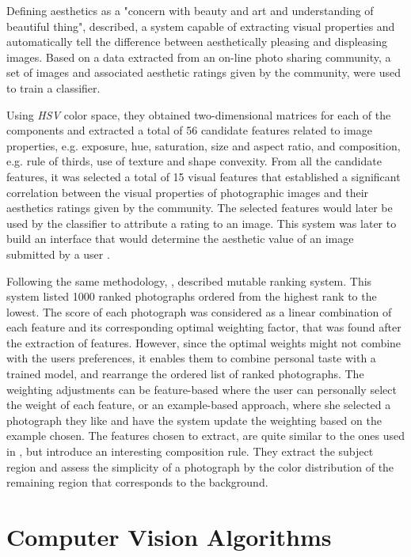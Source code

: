 Defining aesthetics as a "concern with beauty and art and understanding of beautiful thing", \citeauthor{Datta} \cite{Datta} described, a system capable of extracting visual properties and automatically tell the difference between aesthetically pleasing and displeasing images. 
Based on a data extracted from an on-line photo sharing community, a set of images and associated aesthetic ratings given by the community, were used to train a classifier.

Using \emph{HSV} color space, they obtained two-dimensional matrices for each of the components and extracted a total of 56 candidate features related to image properties, e.g. exposure, hue, saturation, size and aspect ratio, and composition, e.g. rule of thirds, use of texture and shape convexity.
From all the candidate features, it was selected a total of 15 visual features that established a significant correlation between the visual properties of photographic images and their aesthetics ratings given by the community. The selected features would later be used by the classifier to attribute a rating to an image.
This system was later to build an interface that would determine the aesthetic value of an image submitted by a user \cite{Datta2010}.

Following the same methodology, \citeauthor{Yeh} \cite{Yeh}, described mutable ranking system. This system listed 1000 ranked photographs ordered from the highest rank to the lowest. The score of each photograph was considered as a linear combination of each feature and its corresponding optimal weighting factor, that was found after the extraction of features. However, since the optimal weights might not combine with the users preferences, it enables them to combine personal taste with a trained model, and rearrange the ordered list of ranked photographs.
The weighting adjustments can be feature-based where the user can personally select the weight of each feature, or an example-based approach, where she selected a photograph they like and have the system update the weighting based on the example chosen.
The features chosen to extract, are quite similar to the ones used in \cite{Datta}, but introduce an interesting composition rule. They extract the subject region and assess the simplicity of a photograph by the color distribution of the remaining region that corresponds to the background.


\section{Computer Vision Algorithms}

